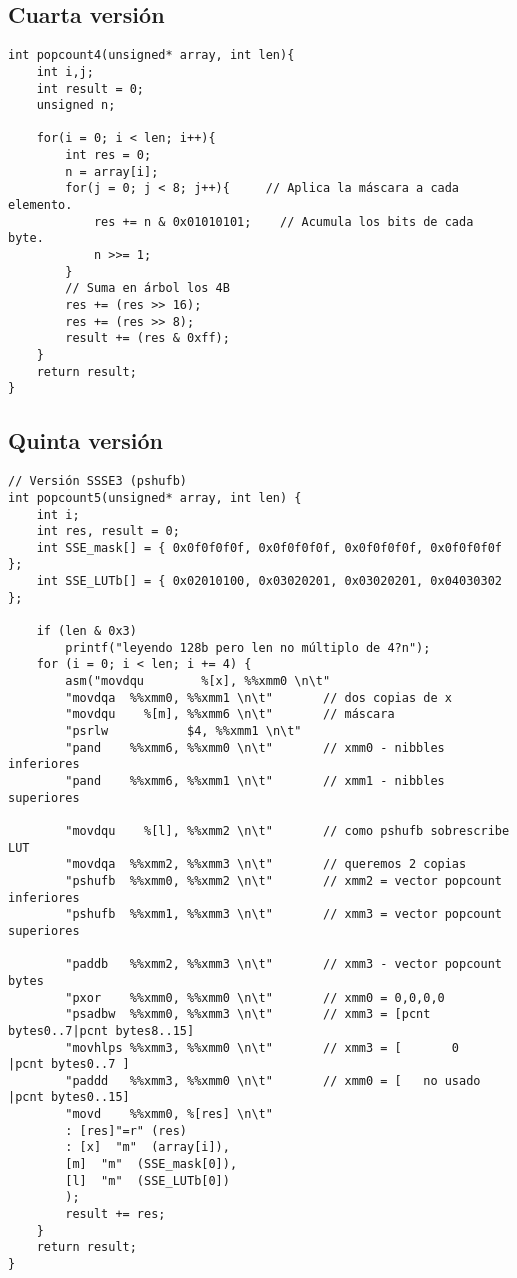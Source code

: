 \subsection{Cuarta versión}
\begin{lstlisting}
int popcount4(unsigned* array, int len){
	int i,j;
	int result = 0;
	unsigned n;
	
	for(i = 0; i < len; i++){
		int res = 0;
		n = array[i];
		for(j = 0; j < 8; j++){     // Aplica la máscara a cada elemento.
			res += n & 0x01010101;    // Acumula los bits de cada byte.
			n >>= 1;
		}
		// Suma en árbol los 4B
		res += (res >> 16);
		res += (res >> 8);
		result += (res & 0xff);
	}
	return result;
}
\end{lstlisting}

\subsection{Quinta versión}
\begin{lstlisting}
// Versión SSSE3 (pshufb)
int popcount5(unsigned* array, int len) {
	int i;
	int res, result = 0;
	int SSE_mask[] = { 0x0f0f0f0f, 0x0f0f0f0f, 0x0f0f0f0f, 0x0f0f0f0f };
	int SSE_LUTb[] = { 0x02010100, 0x03020201, 0x03020201, 0x04030302 };
	
	if (len & 0x3)
		printf("leyendo 128b pero len no múltiplo de 4?n");
	for (i = 0; i < len; i += 4) {
		asm("movdqu        %[x], %%xmm0 \n\t"
		"movdqa  %%xmm0, %%xmm1 \n\t"       // dos copias de x
		"movdqu    %[m], %%xmm6 \n\t"       // máscara
		"psrlw           $4, %%xmm1 \n\t"
		"pand    %%xmm6, %%xmm0 \n\t"       // xmm0 - nibbles inferiores
		"pand    %%xmm6, %%xmm1 \n\t"       // xmm1 - nibbles superiores
		
		"movdqu    %[l], %%xmm2 \n\t"       // como pshufb sobrescribe LUT
		"movdqa  %%xmm2, %%xmm3 \n\t"       // queremos 2 copias
		"pshufb  %%xmm0, %%xmm2 \n\t"       // xmm2 = vector popcount inferiores
		"pshufb  %%xmm1, %%xmm3 \n\t"       // xmm3 = vector popcount superiores
		
		"paddb   %%xmm2, %%xmm3 \n\t"       // xmm3 - vector popcount bytes
		"pxor    %%xmm0, %%xmm0 \n\t"       // xmm0 = 0,0,0,0
		"psadbw  %%xmm0, %%xmm3 \n\t"       // xmm3 = [pcnt bytes0..7|pcnt bytes8..15]
		"movhlps %%xmm3, %%xmm0 \n\t"       // xmm3 = [       0      |pcnt bytes0..7 ]
		"paddd   %%xmm3, %%xmm0 \n\t"       // xmm0 = [   no usado   |pcnt bytes0..15]
		"movd    %%xmm0, %[res] \n\t"
		: [res]"=r" (res)
		: [x]  "m"  (array[i]),
		[m]  "m"  (SSE_mask[0]),
		[l]  "m"  (SSE_LUTb[0])
		);
		result += res;
	}
	return result;
}
\end{lstlisting}

